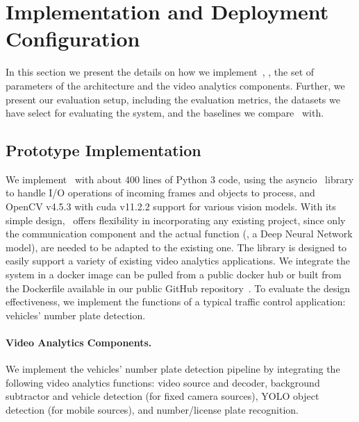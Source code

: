 \section{Implementation and Deployment Configuration}
\label{sec:implementation}

In this section we present the details on how we implement~\videojam{}, \ie, the set of parameters of the architecture and the video analytics components. Further, we present our evaluation setup, including the evaluation metrics, the datasets we have select for evaluating the system, and the baselines we compare~\videojam{} with.

\subsection{Prototype Implementation}

We implement~\videojam{} with about 400 lines of Python 3 code, using the asyncio~\cite{asyncio} library to handle I/O operations of incoming frames and objects to process, and OpenCV v4.5.3 with \acrshort{cuda} v11.2.2 support for various vision models. With its simple design,~\videojam{} offers flexibility in incorporating any existing project, since only the communication component and the actual function (\eg, a Deep Neural Network model), are needed to be adapted to the existing one. The library is designed to easily support a variety of existing video analytics applications. We integrate the system in a docker image can be pulled from a public docker hub or built from the Dockerfile available in our public GitHub repository~. To evaluate the design effectiveness, we implement the functions of a typical traffic control application: vehicles' number plate detection.


\paragraph{Video Analytics Components.} We implement the vehicles' number plate detection pipeline by integrating the following video analytics functions: video source and decoder, background subtractor and vehicle detection (for fixed camera sources), YOLO object detection (for mobile sources), and number/license plate recognition.

